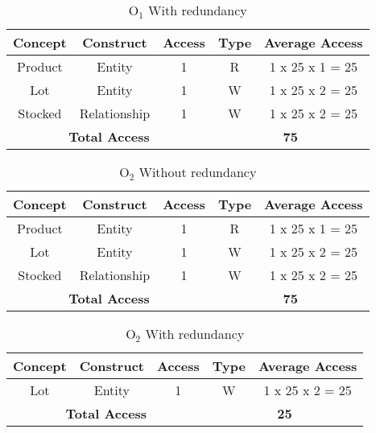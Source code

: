 \begin{table}[!h]\caption{	$ \textrm{O}_\textrm{1} $ With redundancy}
	\begin{center}
		\begin{tabular}{| c | c | c | c | c |}
			\hline
			\textbf{Concept} & \textbf{Construct} & \textbf{Access} & \textbf{Type} & \textbf{Average Access} \\ \hline
			Product & Entity & 1 & R & 1 x 25 x 1 = 25 \\ \hline
			Lot & Entity & 1 & W & 1 x 25 x 2 = 25 \\ \hline
			Stocked & Relationship & 1 & W & 1 x 25 x 2 = 25 \\ \hline
			\multicolumn{3}{|c|}{\textbf{Total Access}} & \multicolumn{2}{|c|}{\textbf{75}} \\ \hline
		\end{tabular}
	\end{center}
\end{table}
\begin{table}[!h]\caption{	$ \textrm{O}_\textrm{2} $ Without redundancy}
	\begin{center}
		\begin{tabular}{| c | c | c | c | c |}
			\hline
			\textbf{Concept} & \textbf{Construct} & \textbf{Access} & \textbf{Type} & \textbf{Average Access} \\ \hline
			Product & Entity & 1 & R & 1 x 25 x 1 = 25 \\ \hline
			Lot & Entity & 1 & W & 1 x 25 x 2 = 25 \\ \hline
			Stocked & Relationship & 1 & W & 1 x 25 x 2 = 25 \\ \hline
			\multicolumn{3}{|c|}{\textbf{Total Access}} & \multicolumn{2}{|c|}{\textbf{75}} \\ \hline
		\end{tabular}
	\end{center}
\end{table}
\begin{table}[!h]\caption{	$ \textrm{O}_\textrm{2} $ With redundancy}
	\begin{center}
		\begin{tabular}{| c | c | c | c | c |}
			\hline
			\textbf{Concept} & \textbf{Construct} & \textbf{Access} & \textbf{Type} & \textbf{Average Access} \\ \hline
			Lot & Entity & 1 & W & 1 x 25 x 2 = 25 \\ \hline
			\multicolumn{3}{|c|}{\textbf{Total Access}} & \multicolumn{2}{|c|}{\textbf{25}} \\ \hline
		\end{tabular}
	\end{center}
\end{table}
